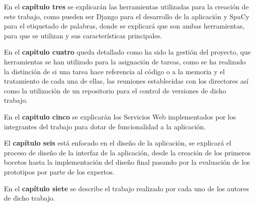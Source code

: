 En el \textbf{capítulo tres} se explicarán las herramientas utilizadas para la creación de este trabajo, como pueden ser Django para el desarrollo de la aplicación y SpaCy para el etiquetado de palabras, donde se explicará que son ambas herramientas, para que se utilizan y sus características principales.

En el \textbf{capitulo cuatro} queda detallado como ha sido la gestión del proyecto, que herramientas se han utilizado para la asignación de tareas, como se ha realizado la distinción de si una tarea hace referencia al código o a la memoria y el tratamiento de cada una de ellas, las reuniones establecidas con los directores así como la utilización de un repositorio para el control de versiones de dicho trabajo.

En el \textbf{capitulo cinco} se explicarán los Servicios Web implementados por los integrantes del trabajo para dotar de funcionalidad a la aplicación.

El \textbf{capítulo seis} está enfocado en el diseño de la aplicación, se explicará el proceso de diseño de la interfaz de la aplicación, desde la creación de los primeros bocetos hasta la implementación del diseño final pasando por la evaluación de los prototipos por parte de los expertos.
 
En el \textbf{capítulo siete} se describe el trabajo realizado por cada uno de los autores de dicho trabajo.
